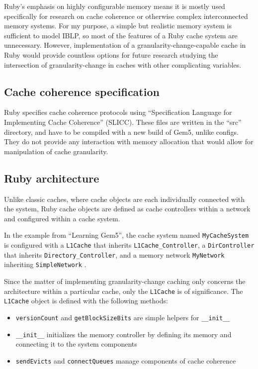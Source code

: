 \documentclass[12pt,twoside]{reedthesis}
\begin{document}
	Ruby's emphasis on highly configurable memory means it is mostly used specifically for research on cache coherence or otherwise complex interconnected memory systems. For my purpose, a simple but realistic memory system is sufficient to model IBLP, so most of the features of a Ruby cache system are unnecessary. However, implementation of a granularity-change-capable cache in Ruby would provide countless options for future research studying the intersection of granularity-change in caches with other complicating variables.

	\subsection*{Cache coherence specification}

	Ruby specifies cache coherence protocols using ``Specification Language for Implementing Cache Coherence'' (SLICC). These files are written in the ``src'' directory, and have to be compiled with a new build of Gem5, unlike configs. They do not provide any interaction with memory allocation that would allow for manipulation of cache granularity.

	\subsection*{Ruby architecture}

	Unlike classic caches, where cache objects are each individually connected with the system, Ruby cache objects are defined as cache controllers within a network and configured within a cache system.
	
	In the example from ``Learning Gem5'', the cache system named \verb`MyCacheSystem` is configured with a \verb`L1Cache` that inherits \verb`L1Cache_Controller`, a \verb`DirController` that inherits \verb`Directory_Controller`, and a memory network \verb`MyNetwork` inheriting \verb`SimpleNetwork` \cite{gem5-tutorial}.

	Since the matter of implementing granularity-change caching only concerns the architecture within a particular cache, only the \verb`L1Cache` is of significance. The \verb`L1Cache` object is defined with the following methods: \begin{itemize}
		\item \verb`versionCount` and \verb`getBlockSizeBits` are simple helpers for \verb`__init__`
		\item \verb`__init__` initializes the memory controller by defining its memory and connecting it to the system components
		\item \verb`sendEvicts` and \verb`connectQueues` manage components of cache coherence
	\end{itemize}
\end{document}

